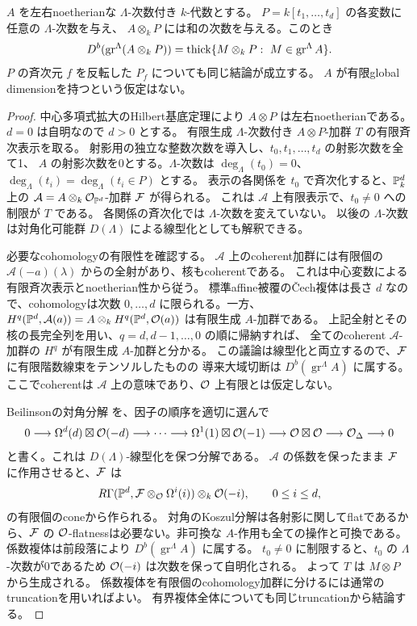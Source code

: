 \begin{lemma}[非可換係数を持つ多項式拡大]\label{lem:polynomial-coefficient}
 \(A\) を左右noetherianな \(\Lambda\)-次数付き \(k\)-代数とする。
 \(P=k[t_1,\ldots,t_d]\) の各変数に任意の \(\Lambda\)-次数を与え、
 \(A\otimes_kP\) には和の次数を与える。このとき
 \[
 D^b(\operatorname{gr}^{\Lambda}(A\otimes_kP))
 =\operatorname{thick}\{M\otimes_kP:\ M\in\operatorname{gr}^{\Lambda}A\}.
 \]
 \(P\) の斉次元 \(f\) を反転した \(P_f\) についても同じ結論が成立する。
 \(A\) が有限global dimensionを持つという仮定はない。
\end{lemma}
\begin{proof}
 中心多項式拡大のHilbert基底定理により \(A\otimes P\) は左右noetherianである。
 \(d=0\) は自明なので \(d>0\) とする。
 有限生成 \(\Lambda\)-次数付き \(A\otimes P\)-加群 \(T\) の有限斉次表示を取る。
 射影用の独立な整数次数を導入し、\(t_0,t_1,\ldots,t_d\) の射影次数を全て1、
 \(A\) の射影次数を0とする。\(\Lambda\)-次数は
 \(\deg_\Lambda(t_0)=0\)、\(\deg_\Lambda(t_i)=\deg_\Lambda(t_i\in P)\) とする。
 表示の各関係を \(t_0\) で斉次化すると、\(\mathbb P^d_k\) 上の
 \(\mathcal A=A\otimes_k\mathcal O_{\mathbb P^d}\)-加群 \(\mathcal F\) が得られる。
 これは \(\mathcal A\) 上有限表示で、\(t_0\ne0\) への制限が \(T\) である。
 各関係の斉次化では \(\Lambda\)-次数を変えていない。
 以後の \(\Lambda\)-次数は対角化可能群 \(D(\Lambda)\) による線型化としても解釈できる。

 必要なcohomologyの有限性を確認する。
 \(\mathcal A\) 上のcoherent加群には有限個の
 \(\mathcal A(-a)(\lambda)\) からの全射があり、核もcoherentである。
 これは中心変数による有限斉次表示とnoetherian性から従う。
 標準affine被覆の\v Cech複体は長さ \(d\) なので、cohomologyは次数 \(0,\ldots,d\)
 に限られる。一方、\(H^q(\mathbb P^d,\mathcal A(a))
 =A\otimes_kH^q(\mathbb P^d,\mathcal O(a))\) は有限生成 \(A\)-加群である。
 上記全射とその核の長完全列を用い、\(q=d,d-1,\ldots,0\) の順に帰納すれば、
 全てのcoherent \(\mathcal A\)-加群の \(H^q\) が有限生成 \(A\)-加群と分かる。
 この議論は線型化と両立するので、\(\mathcal F\) に有限階数線束をテンソルしたものの
 導来大域切断は \(D^b(\operatorname{gr}^{\Lambda}A)\) に属する。
 ここでcoherentは \(\mathcal A\) 上の意味であり、\(\mathcal O\) 上有限とは仮定しない。

 Beilinsonの対角分解 \cite{Beilinson} を、因子の順序を適切に選んで
 \[
 0\longrightarrow\Omega^d(d)\boxtimes\mathcal O(-d)
 \longrightarrow\cdots\longrightarrow
 \Omega^1(1)\boxtimes\mathcal O(-1)
 \longrightarrow\mathcal O\boxtimes\mathcal O
 \longrightarrow\mathcal O_\Delta\longrightarrow0
 \]
 と書く。これは \(D(\Lambda)\)-線型化を保つ分解である。
 \(\mathcal A\) の係数を保ったまま \(\mathcal F\) に作用させると、\(\mathcal F\) は
 \[
 R\Gamma(\mathbb P^d,\mathcal F\otimes_{\mathcal O}\Omega^i(i))\otimes_k\mathcal O(-i),
 \qquad 0\le i\le d,
 \]
 の有限個のconeから作られる。
 対角のKoszul分解は各射影に関してflatであるから、\(\mathcal F\) の
 \(\mathcal O\)-flatnessは必要ない。非可換な \(A\)-作用も全ての操作と可換である。
 係数複体は前段落により \(D^b(\operatorname{gr}^{\Lambda}A)\) に属する。
 \(t_0\ne0\) に制限すると、\(t_0\) の \(\Lambda\)-次数が0であるため
 \(\mathcal O(-i)\) は次数を保って自明化される。
 よって \(T\) は \(M\otimes P\) から生成される。
 係数複体を有限個のcohomology加群に分けるには通常のtruncationを用いればよい。
 有界複体全体についても同じtruncationから結論する。


\end{proof}
